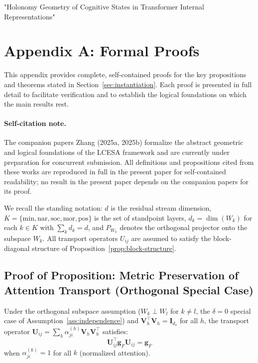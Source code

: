 "Holonomy Geometry of Cognitive States in Transformer Internal Representations"

\section*{Appendix A: Formal Proofs}
\label{app:proofs}

This appendix provides complete, self-contained proofs for the key propositions and
theorems stated in Section~\ref{sec:instantiation}. Each proof is presented in full
detail to facilitate verification and to establish the logical foundations on which the
main results rest.

\paragraph{Self-citation note.}
The companion papers Zhang (2025a, 2025b) formalize the abstract geometric and logical
foundations of the LCESA framework and are currently under preparation for concurrent
submission. All definitions and propositions cited from these works are reproduced in full
in the present paper for self-contained readability; no result in the present paper
depends on the companion papers for its proof.

We recall the standing notation: $d$ is the residual stream dimension,
$K = \{\mathrm{min}, \mathrm{nar}, \mathrm{soc}, \mathrm{mor}, \mathrm{pos}\}$ is the set
of standpoint layers, $d_k = \dim(W_k)$ for each $k \in K$ with $\sum_k d_k = d$, and
$P_{W_k}$ denotes the orthogonal projector onto the subspace $W_k$. All transport
operators $U_{ij}$ are assumed to satisfy the block-diagonal structure of
Proposition~\ref{prop:block-structure}.

\subsection{Proof of Proposition: Metric Preservation of Attention Transport (Orthogonal Special Case)}
\label{app:proof-metric-preservation}

\begin{proposition}
\label{prop:metric-preservation-app}
Under the orthogonal subspace assumption ($W_k \perp W_l$ for $k \neq l$, the $\delta = 0$
special case of Assumption~\ref{ass:independence}) and $\mathbf{V}_h^\top \mathbf{V}_h =
\mathbf{I}_{d_v}$ for all $h$, the transport operator $\mathbf{U}_{ij} = \sum_h
\alpha_{ji}^{(h)} \mathbf{V}_h \mathbf{V}_h^\top$ satisfies:
\[
    \mathbf{U}_{ij}^\top \mathbf{g}_F \mathbf{U}_{ij} = \mathbf{g}_F
\]
when $\alpha_{ji}^{(k)} = 1$ for all $k$ (normalized attention).
\end{proposition}

